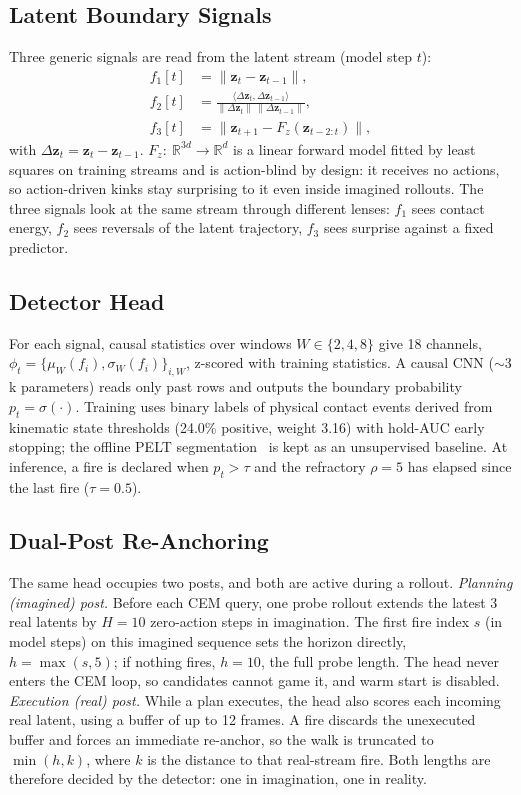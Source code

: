 \documentclass[conference]{IEEEtran}
\begin{document}
\subsection{Latent Boundary Signals}
Three generic signals are read from the latent stream (model step $t$):
\begin{align}
f_1[t] &= \lVert \mathbf{z}_t-\mathbf{z}_{t-1}\rVert, \\
f_2[t] &= \frac{\langle\Delta\mathbf{z}_t,\Delta\mathbf{z}_{t-1}\rangle}{\lVert\Delta\mathbf{z}_t\rVert\,\lVert\Delta\mathbf{z}_{t-1}\rVert}, \\
f_3[t] &= \lVert \mathbf{z}_{t+1}-F_z(\mathbf{z}_{t-2:t})\rVert,
\end{align}
with $\Delta\mathbf{z}_t=\mathbf{z}_t-\mathbf{z}_{t-1}$. $F_z{:}\ \mathbb{R}^{3d}\to\mathbb{R}^d$ is a linear forward model fitted by least squares on training streams and is action-blind by design: it receives no actions, so action-driven kinks stay surprising to it even inside imagined rollouts. The three signals look at the same stream through different lenses: $f_1$ sees contact energy, $f_2$ sees reversals of the latent trajectory, $f_3$ sees surprise against a fixed predictor.

\subsection{Detector Head}
For each signal, causal statistics over windows $W\in\{2,4,8\}$ give 18 channels, $\phi_t=\{\mu_W(f_i),\sigma_W(f_i)\}_{i,W}$, z-scored with training statistics. A causal CNN (${\sim}3$k parameters) reads only past rows and outputs the boundary probability $p_t=\sigma(\cdot)$. Training uses binary labels of physical contact events derived from kinematic state thresholds (24.0\% positive, weight 3.16) with hold-AUC early stopping; the offline PELT segmentation~\cite{killick2012pelt} is kept as an unsupervised baseline. At inference, a fire is declared when $p_t>\tau$ and the refractory $\rho=5$ has elapsed since the last fire ($\tau=0.5$).

\subsection{Dual-Post Re-Anchoring}
The same head occupies two posts, and both are active during a rollout.
\textit{Planning (imagined) post.} Before each CEM query, one probe rollout extends the latest 3 real latents by $H=10$ zero-action steps in imagination. The first fire index $s$ (in model steps) on this imagined sequence sets the horizon directly, $h=\max(s,5)$; if nothing fires, $h=10$, the full probe length. The head never enters the CEM loop, so candidates cannot game it, and warm start is disabled.
\textit{Execution (real) post.} While a plan executes, the head also scores each incoming real latent, using a buffer of up to 12 frames. A fire discards the unexecuted buffer and forces an immediate re-anchor, so the walk is truncated to $\min(h,k)$, where $k$ is the distance to that real-stream fire. Both lengths are therefore decided by the detector: one in imagination, one in reality.
\end{document}
